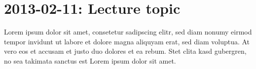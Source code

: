 \section{2013-02-11: Lecture topic}

Lorem ipsum dolor sit amet, consetetur sadipscing elitr, sed diam nonumy eirmod
tempor invidunt ut labore et dolore magna aliquyam erat, sed diam voluptua. At
vero eos et accusam et justo duo dolores et ea rebum. Stet clita kasd gubergren,
no sea takimata sanctus est Lorem ipsum dolor sit amet.

